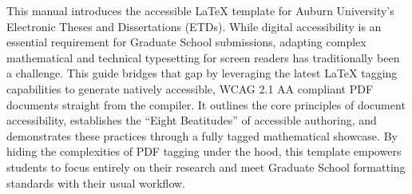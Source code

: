 This manual introduces the accessible LaTeX template for Auburn University's Electronic Theses and Dissertations (ETDs). While digital accessibility is an essential requirement for Graduate School submissions, adapting complex mathematical and technical typesetting for screen readers has traditionally been a challenge. This guide bridges that gap by leveraging the latest LaTeX tagging capabilities to generate natively accessible, WCAG 2.1 AA compliant PDF documents straight from the compiler. It outlines the core principles of document accessibility, establishes the \enquote{Eight Beatitudes} of accessible authoring, and demonstrates these practices through a fully tagged mathematical showcase. By hiding the complexities of PDF tagging under the hood, this template empowers students to focus entirely on their research and meet Graduate School formatting standards with their usual workflow.
